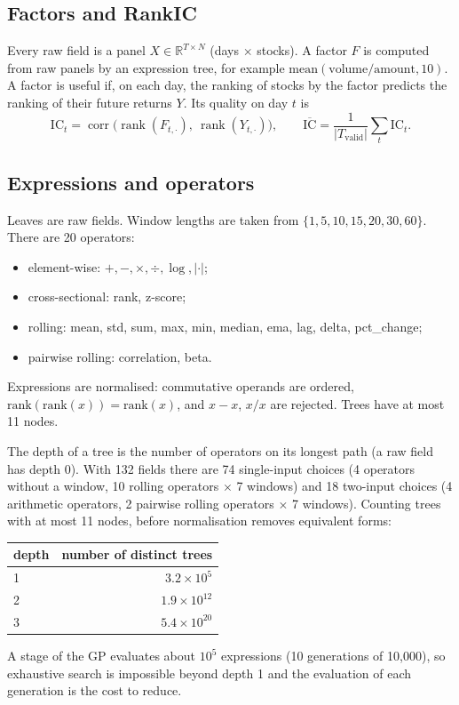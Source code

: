 \documentclass[11pt,a4paper]{article}
\begin{document}
\subsection{Factors and RankIC}
Every raw field is a panel $X\in\mathbb{R}^{T\times N}$ (days $\times$ stocks). A factor $F$ is computed from raw panels by an expression tree, for example $\mathrm{mean}(\text{volume}/\text{amount}, 10)$. A factor is useful if, on each day, the ranking of stocks by the factor predicts the ranking of their future returns $Y$. Its quality on day $t$ is
\begin{equation}
  \mathrm{IC}_t = \operatorname{corr}\!\big(\operatorname{rank}(F_{t,\cdot}),\ \operatorname{rank}(Y_{t,\cdot})\big),
  \qquad \overline{\mathrm{IC}} = \frac{1}{|T_{\mathrm{valid}}|}\sum_{t} \mathrm{IC}_t .
\end{equation}

\subsection{Expressions and operators}
Leaves are raw fields. Window lengths are taken from $\{1,5,10,15,20,30,60\}$. There are 20 operators:
\begin{itemize}[nosep]
  \item element-wise: $+,-,\times,\div,\log,|\cdot|$;
  \item cross-sectional: rank, z-score;
  \item rolling: mean, std, sum, max, min, median, ema, lag, delta, pct\_change;
  \item pairwise rolling: correlation, beta.
\end{itemize}
Expressions are normalised: commutative operands are ordered, $\mathrm{rank}(\mathrm{rank}(x))=\mathrm{rank}(x)$, and $x-x$, $x/x$ are rejected. Trees have at most 11 nodes.

\label{sec:space}
The depth of a tree is the number of operators on its longest path (a raw field has depth 0). With 132 fields there are 74 single-input choices (4 operators without a window, 10 rolling operators $\times$ 7 windows) and 18 two-input choices (4 arithmetic operators, 2 pairwise rolling operators $\times$ 7 windows). Counting trees with at most 11 nodes, before normalisation removes equivalent forms:

\begin{center}
\begin{tabular}{lr}
\toprule
depth & number of distinct trees \\
\midrule
1 & $3.2\times10^{5}$ \\
2 & $1.9\times10^{12}$ \\
3 & $5.4\times10^{20}$ \\
\bottomrule
\end{tabular}
\end{center}
A stage of the GP evaluates about $10^5$ expressions (10 generations of 10{,}000), so exhaustive search is impossible beyond depth 1 and the evaluation of each generation is the cost to reduce.
\end{document}
